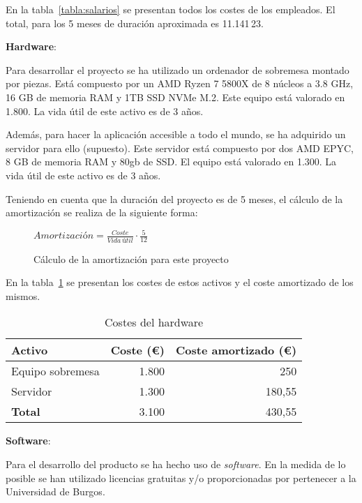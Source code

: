 En la tabla~\ref{tabla:salarios} se presentan todos los costes de los empleados.
El total, para los 5 meses de duración aproximada es 11.141\,23\texteuro.

\textbf{Hardware}:

Para desarrollar el proyecto se ha utilizado un ordenador de sobremesa montado
por piezas. Está compuesto por un AMD Ryzen 7 5800X de 8 núcleos a 3.8 GHz, 16
GB de memoria RAM y 1TB SSD NVMe M.2. Este equipo está valorado en
1.800\texteuro. La vida útil de este activo es de 3 años.

Además, para hacer la aplicación accesible a todo el mundo, se ha adquirido un
servidor para ello (supuesto). Este servidor está compuesto por dos AMD EPYC, 8
GB de memoria RAM y 80gb de SSD. El equipo está valorado en 1.300\texteuro. La
vida útil de este activo es de 3 años.

Teniendo en cuenta que la duración del proyecto es de 5 meses, el cálculo de la
amortización se realiza de la siguiente forma:

\begin{figure}[H]
\begin{center}
$Amortización = \frac{Coste}{Vida~útil} \cdot \frac{5}{12}$
\end{center}
\caption{Cálculo de la amortización para este proyecto}
\end{figure}


En la tabla~\ref{tabla:hardware} se presentan los costes de estos activos y el
coste amortizado de los mismos.

\begin{table}[H]
    \centering
\begin{tabular}{lrr}
\toprule
\textbf{Activo}      & \textbf{Coste (€)}      & \textbf{Coste amortizado (€)}      \\ \midrule
Equipo sobremesa     & 1.800                    & 250                      \\
Servidor             & 1.300                    & 180,55                      \\ \midrule
\textbf{Total}       & 3.100                    & 430,55                      \\ \midrule
\end{tabular}
\caption{Costes del hardware}
\label{tabla:hardware}
\end{table}


\textbf{Software}:

Para el desarrollo del producto se ha hecho uso de \textit{software}. En la
medida de lo posible se han utilizado licencias gratuitas y/o proporcionadas por
pertenecer a la Universidad de Burgos.

